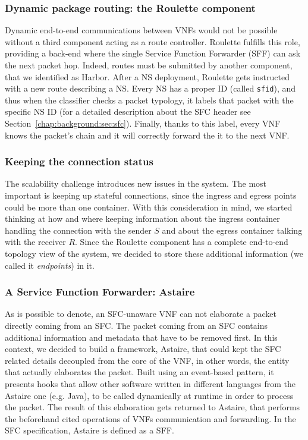 \subsubsection{Dynamic package routing: the Roulette component}
\label{chap:prjan:sec:tech:sub:SFC:sub:roulette}
Dynamic end-to-end communications between VNFs would not be possible without a
third component acting as a route controller. Roulette fulfills this role,
providing a back-end where the single Service Function Forwarder (SFF) can ask
the next packet hop. Indeed, routes must be submitted by another component, that
we identified as Harbor. After a NS deployment, Roulette gets instructed with a
new route describing a NS. Every NS has a proper ID (called \verb!sfid!), and
thus when the classifier checks a packet typology, it labels that packet with
the specific NS ID (for a detailed description about the SFC header see
Section~\ref{chap:background:sec:sfc}). Finally, thanks to this label, every VNF
knows the packet's chain and it will correctly forward the it to the next VNF.

\subsubsection{Keeping the connection status}
The scalability challenge introduces new issues in the system. The most
important is keeping up stateful connections, since the ingress and egress
points could be more than one container. With this consideration in mind, we
started thinking at how and where keeping information about the ingress
container handling the connection with the sender $S$ and about the egress
container talking with the receiver $R$. Since the Roulette component has a
complete end-to-end topology view of the system, we decided to store these
additional information (we called it \emph{endpoints}) in it.

\subsubsection{A Service Function Forwarder: Astaire}
As is possible to denote, an SFC-unaware VNF can not elaborate a packet directly
coming from an SFC. The packet coming from an SFC contains additional
information and metadata that have to be removed first. In this context, we
decided to build a framework, Astaire, that could kept the SFC related details
decoupled from the core of the VNF, in other words, the entity that actually
elaborates the packet. Built using an event-based pattern, it presents hooks
that allow other software written in different languages from the Astaire one
(e.g. Java), to be called dynamically at runtime in order to process the packet.
The result of this elaboration gets returned to Astaire, that performs the
beforehand cited operations of VNFs communication and forwarding. In the SFC
specification, Astaire is defined as a SFF.

